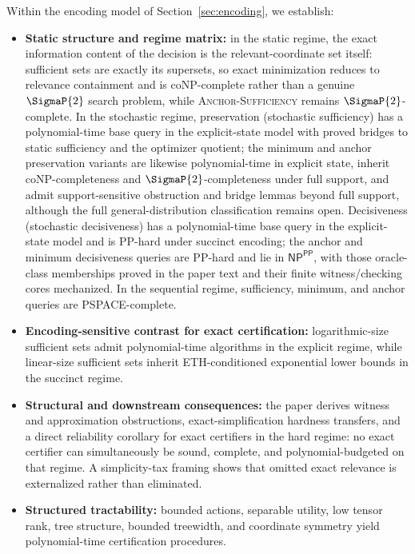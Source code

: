 Within the encoding model of Section~\ref{sec:encoding}, we establish:
\begin{itemize}
\item \textbf{Static structure and regime matrix:} in the static regime, the exact information content of the decision is the relevant-coordinate set itself: sufficient sets are exactly its supersets, so exact minimization reduces to relevance containment and is coNP-complete rather than a genuine $\SigmaP{2}$ search problem, while \textsc{Anchor-Sufficiency} remains $\SigmaP{2}$-complete. In the stochastic regime, preservation (stochastic sufficiency) has a polynomial-time base query in the explicit-state model with proved bridges to static sufficiency and the optimizer quotient; the minimum and anchor preservation variants are likewise polynomial-time in explicit state, inherit coNP-completeness and $\SigmaP{2}$-completeness under full support, and admit support-sensitive obstruction and bridge lemmas beyond full support, although the full general-distribution classification remains open. Decisiveness (stochastic decisiveness) has a polynomial-time base query in the explicit-state model and is PP-hard under succinct encoding; the anchor and minimum decisiveness queries are PP-hard and lie in $\textsf{NP}^{\textsf{PP}}$, with those oracle-class memberships proved in the paper text and their finite witness/checking cores mechanized. In the sequential regime, sufficiency, minimum, and anchor queries are PSPACE-complete.
\item \textbf{Encoding-sensitive contrast for exact certification:} logarithmic-size sufficient sets admit polynomial-time algorithms in the explicit regime, while linear-size sufficient sets inherit ETH-conditioned exponential lower bounds in the succinct regime.
\item \textbf{Structural and downstream consequences:} the paper derives witness and approximation obstructions, exact-simplification hardness transfers, and a direct reliability corollary for exact certifiers in the hard regime: no exact certifier can simultaneously be sound, complete, and polynomial-budgeted on that regime. A simplicity-tax framing shows that omitted exact relevance is externalized rather than eliminated.
\item \textbf{Structured tractability:} bounded actions, separable utility, low tensor rank, tree structure, bounded treewidth, and coordinate symmetry yield polynomial-time certification procedures.
\end{itemize}

